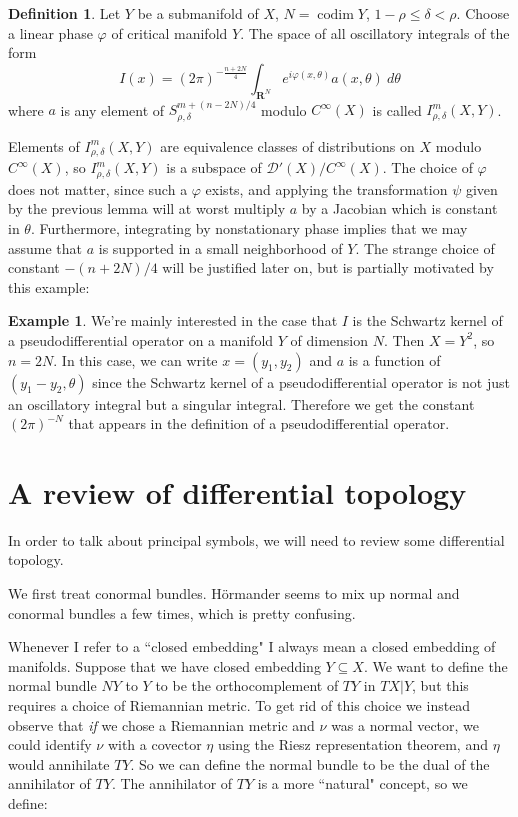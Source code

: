 \documentclass[reqno,12pt,letterpaper]{amsart}
\newcommand{\RR}{\mathbf{R}}
\DeclareMathOperator{\codim}{codim}
\theoremstyle{definition}
\newtheorem{definition}[theorem]{Definition}
\newtheorem{example}[theorem]{Example}
\begin{document}
\begin{definition}
Let $Y$ be a submanifold of $X$, $N = \codim Y$, $1 - \rho \leq \delta < \rho$. Choose a linear phase $\varphi$ of critical manifold $Y$.
The space of all oscillatory integrals of the form
$$I(x) = (2\pi)^{-\frac{n+2N}{4}} \int_{\RR^N} e^{i\varphi(x, \theta)} a(x, \theta) ~d\theta$$
where $a$ is any element of $S^{m+(n-2N)/4}_{\rho,\delta}$ modulo $C^\infty(X)$ is called $I^m_{\rho,\delta}(X, Y)$.
\end{definition}

Elements of $I^m_{\rho,\delta}(X, Y)$ are equivalence classes of distributions on $X$ modulo $C^\infty(X)$, so $I^m_{\rho,\delta}(X, Y)$ is a subspace of $\mathcal D'(X)/C^\infty(X)$.
The choice of $\varphi$ does not matter, since such a $\varphi$ exists, and applying the transformation $\psi$ given by the previous lemma will at worst multiply $a$ by a Jacobian which is constant in $\theta$.
Furthermore, integrating by nonstationary phase implies that we may assume that $a$ is supported in a small neighborhood of $Y$.
The strange choice of constant $-(n+2N)/4$ will be justified later on, but is partially motivated by this example:

\begin{example}
We're mainly interested in the case that $I$ is the Schwartz kernel of a pseudodifferential operator on a manifold $Y$ of dimension $N$.
Then $X = Y^2$, so $n = 2N$.
In this case, we can write $x = (y_1, y_2)$ and $a$ is a function of $(y_1 - y_2, \theta)$ since the Schwartz kernel of a pseudodifferential operator is not just an oscillatory integral but a singular integral.
Therefore we get the constant $(2\pi)^{-N}$ that appears in the definition of a pseudodifferential operator.
\end{example}

\section{A review of differential topology}
In order to talk about principal symbols, we will need to review some differential topology.

We first treat conormal bundles.
H\"ormander seems to mix up normal and conormal bundles a few times, which is pretty confusing.

Whenever I refer to a ``closed embedding" I always mean a closed embedding of manifolds.
Suppose that we have closed embedding $Y \subseteq X$.
We want to define the normal bundle $NY$ to $Y$ to be the orthocomplement of $TY$ in $TX|Y$, but this requires a choice of Riemannian metric.
To get rid of this choice we instead observe that \emph{if} we chose a Riemannian metric and $\nu$ was a normal vector, we could identify $\nu$ with a covector $\eta$ using the Riesz representation theorem, and $\eta$ would annihilate $TY$.
So we can define the normal bundle to be the dual of the annihilator of $TY$.
The annihilator of $TY$ is a more ``natural" concept, so we define:
\end{document}
